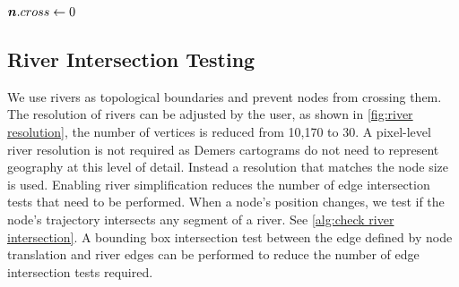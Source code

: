 \begin{algorithm}[tb!]
\begin{algorithmic}[1]
                            \Else

                                \State {}
                                \State $ \bm{n}.cross \gets 0 $ 

                            \EndIf
                            
                        \EndIf

                    \EndIf

                \EndFor
        \State {}
        \EndProcedure
    \end{algorithmic}
\end{algorithm}

\color{black}



\subsection{River Intersection Testing}

We use rivers as topological boundaries and prevent nodes from crossing them. The resolution of rivers can be adjusted by the user, as shown in \autoref{fig:river resolution}, the number of vertices is reduced from 10,170 to 30. A pixel-level river resolution is not required as Demers cartograms do not need to represent geography at this level of detail. Instead a resolution that matches the node size is used. Enabling river simplification reduces the number of edge intersection tests that need to be performed. When a node's position changes, we test if the node's trajectory intersects any segment of a river. See \autoref{alg:check river intersection}. A bounding box intersection test between the edge defined by node translation and river edges can be performed to reduce the number of edge intersection tests required.


